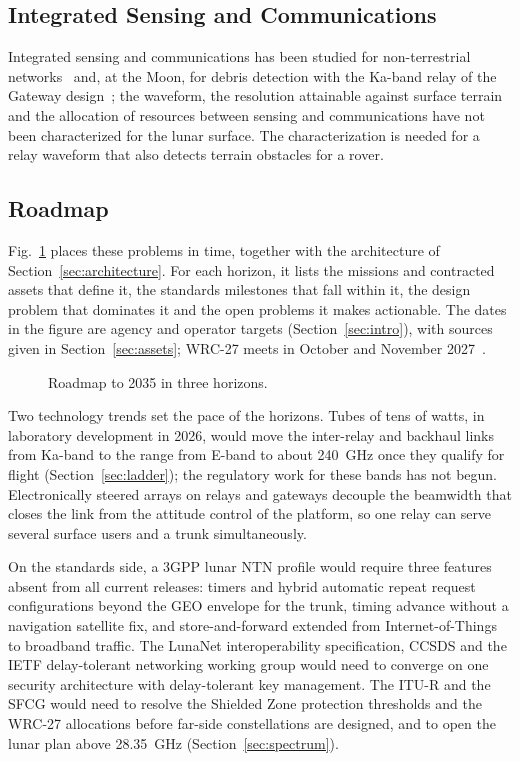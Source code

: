 \documentclass{IEEEoj}
\begin{document}
\subsection{Integrated Sensing and Communications}
Integrated sensing and communications has been studied for non-terrestrial networks~\cite{isac_ntn2026} and, at the Moon, for debris detection with the Ka-band relay of the Gateway design~\cite{dong_cislunarsense}; the waveform, the resolution attainable against surface terrain and the allocation of resources between sensing and communications have not been characterized for the lunar surface. The characterization is needed for a relay waveform that also detects terrain obstacles for a rover.

\subsection{Roadmap}
\label{sec:roadmap}
Fig.~\ref{fig:roadmap} places these problems in time, together with the architecture of Section~\ref{sec:architecture}. For each horizon, it lists the missions and contracted assets that define it, the standards milestones that fall within it, the design problem that dominates it and the open problems it makes actionable. The dates in the figure are agency and operator targets (Section~\ref{sec:intro}), with sources given in Section~\ref{sec:assets}; WRC-27 meets in October and November 2027~\cite{itu_wrc27}.
\begin{figure}[!t]
\centering
\resizebox{\textwidth}{!}{}
\caption{Roadmap to 2035 in three horizons.}
\label{fig:roadmap}
\end{figure}

Two technology trends set the pace of the horizons. Tubes of tens of watts, in laboratory development in 2026, would move the inter-relay and backhaul links from Ka-band to the range from E-band to about \SI{240}{GHz} once they qualify for flight (Section~\ref{sec:ladder}); the regulatory work for these bands has not begun. Electronically steered arrays on relays and gateways decouple the beamwidth that closes the link from the attitude control of the platform, so one relay can serve several surface users and a trunk simultaneously.

On the standards side, a 3GPP lunar NTN profile would require three features absent from all current releases: timers and hybrid automatic repeat request configurations beyond the GEO envelope for the trunk, timing advance without a navigation satellite fix, and store-and-forward extended from Internet-of-Things to broadband traffic. The LunaNet interoperability specification, CCSDS and the IETF delay-tolerant networking working group would need to converge on one security architecture with delay-tolerant key management. The ITU-R and the SFCG would need to resolve the Shielded Zone protection thresholds and the WRC-27 allocations before far-side constellations are designed, and to open the lunar plan above \SI{28.35}{GHz} (Section~\ref{sec:spectrum}).
\end{document}
